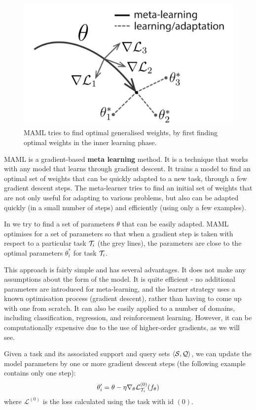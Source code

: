 \begin{figure}
    \centering
    \includegraphics[scale=0.23]{chapters/assets/fsl/maml.png}
    \caption{MAML tries to find optimal generalised weights, by first finding optimal weights in the inner learning phase.}
    \label{fig:maml}
\end{figure}
MAML is a gradient-based \textbf{meta learning} method. It is a technique that works with any model that learns through gradient descent. It trains a model to find an optimal set of weights that can be quickly adapted to a new task, through a few gradient descent steps. The meta-learner tries to find an initial set of weights that are not only useful for adapting to various problems, but also can be adapted quickly (in a small number of steps) and efficiently (using only a few examples).

In  we try to find a set of parameters $\theta$ that can be easily adapted. MAML optimises for a set of parameters so that when a gradient step is taken with respect to a particular task $\mathcal{T}_i $ (the grey lines), the parameters are close to the optimal parameters $\theta^*_i$ for task $\mathcal{T}_i$.

This approach is fairly simple and has several advantages. It does not make any assumptions about the form of the model. It is quite efficient - no additional parameters are introduced for meta-learning, and the learner strategy uses a known optimisation process (gradient descent), rather than having to come up with one from scratch. It can also be easily applied to a number of domains, including classification, regression, and reinforcement learning. However, it can be computationally expensive due to the use of higher-order gradients, as we will see.

Given a task and its associated support and query sets $\langle \mathcal{S}, \mathcal{Q} \rangle$, we can update the model parameters by one or more gradient descent steps (the following example contains only one step):
\begin{equation}
    \theta^\prime_i = \theta - \eta \nabla_\theta\mathcal{L}^{(0)}_{\mathcal{T}_i}(f_\theta)
    \label{eqn:one-task-maml}
\end{equation}
where $\mathcal{L}^{(0)}$ is the loss calculated using the task with id $(0)$.

